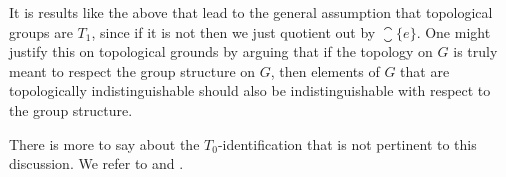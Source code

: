 \documentclass[article, a4paper, 11pt, oneside]{memoir}
\numberwithin{equation}{chapter}
\begin{document}
It is results like the above that lead to the general assumption that topological groups are $T_1$, since if it is not then we just quotient out by $\closure{\{e\}}$. One might justify this on topological grounds by arguing that if the topology on $G$ is truly meant to respect the group structure on $G$, then elements of $G$ that are topologically indistinguishable should also be indistinguishable with respect to the group structure.

There is more to say about the $T_0$-identification that is not pertinent to this discussion. We refer to \textcite[Exercise~13C]{willard} and \textcite{pirttimäki2019}.


\nocite{*}

\printbibliography
\end{document}
